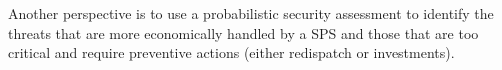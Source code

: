 Another perspective is to use a probabilistic security assessment to identify the threats that are more economically handled by a SPS and those that are too critical and require preventive actions (either redispatch or investments).

